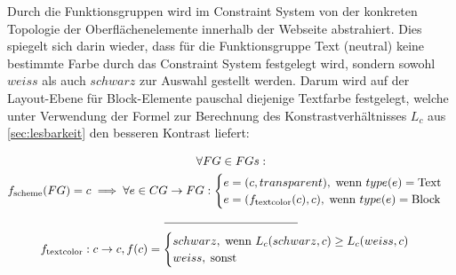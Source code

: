 Durch die Funktionsgruppen wird im Constraint System von der konkreten Topologie der Oberflächenelemente innerhalb der Webseite abstrahiert. Dies spiegelt sich darin wieder, dass für die Funktionsgruppe \glqq{}Text (neutral)\grqq{} keine bestimmte Farbe durch das Constraint System festgelegt wird, sondern sowohl $weiss$ als auch $schwarz$ zur Auswahl gestellt werden. Darum wird auf der Layout-Ebene für Block-Elemente pauschal diejenige Textfarbe festgelegt, welche unter Verwendung der Formel zur Berechnung des Konstrastverhältnisses $L_c$ aus \autoref{sec:lesbarkeit} den besseren Kontrast liefert:


\begin{equation}
\begin{gathered}
	    \forall FG \in FGs:\\
	    f_\text{scheme}(FG) = c \implies \forall e \in CG \to FG:
  	\begin{cases}
		e = (c, transparent),\; \text{wenn } type(e) = \text{Text} \\
		e = (f_\text{textcolor}(c), c), \; \text{wenn } type(e) = \text{Block}
	\end{cases}\\
	  \mathclap{\rule{4cm}{0.4pt}}\\
 	f_\text{textcolor}: c \to c, f(c) =
  		   	\begin{cases}
  		   		schwarz,\; \text{wenn } L_c(schwarz, c) \geq L_c(weiss, c) \\
		weiss,\; \text{sonst} \\
	\end{cases}
\end{gathered}
\end{equation}


  

